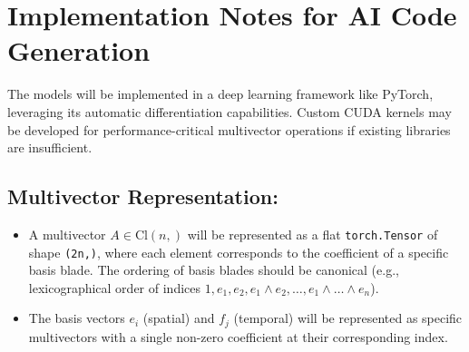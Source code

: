 \documentclass[11pt]{article}
\newcommand{\Cl}[2]{\text{Cl}(#1, #2)} %
\begin{document}
\section{Implementation Notes for AI Code Generation}
The models will be implemented in a deep learning framework like PyTorch, leveraging its automatic differentiation capabilities. Custom CUDA kernels may be developed for performance-critical multivector operations if existing libraries are insufficient.

\subsection{Multivector Representation:}
\begin{itemize}[noitemsep]
    \item A multivector $A \in \Cl{n}{}$ will be represented as a flat \texttt{torch.Tensor} of shape \texttt{(2\textasciicirc n,)}, where each element corresponds to the coefficient of a specific basis blade. The ordering of basis blades should be canonical (e.g., lexicographical order of indices $1, e_1, e_2, e_1 \wedge e_2, \dots, e_1 \wedge \dots \wedge e_n$).
    \item The basis vectors $e_i$ (spatial) and $f_j$ (temporal) will be represented as specific multivectors with a single non-zero coefficient at their corresponding index.
\end{itemize}
\end{document}
